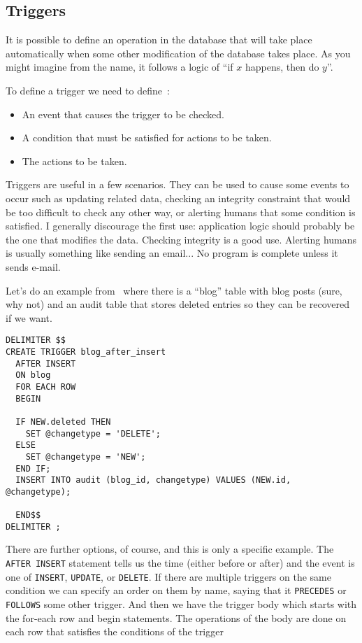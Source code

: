 \documentclass[a4paper]{report}
\begin{document}
\subsection*{Triggers}

It is possible to define an operation in the database that will take place automatically when some other modification of the database takes place. As you might imagine from the name, it follows a logic of ``if $x$ happens, then do $y$''. 

To define a trigger we need to define~\cite{dsc}:
\begin{itemize}
	\item An event that causes the trigger to be checked.
	\item A condition that must be satisfied for actions to be taken.
	\item The actions to be taken.
\end{itemize}

Triggers are useful in a few scenarios. They can be used to cause some events to occur such as updating related data, checking an integrity constraint that would be too difficult to check any other way, or alerting humans that some condition is satisfied. I generally discourage the first use: application logic should probably be the one that modifies the data. Checking integrity is a good use. Alerting humans is usually something like sending an email... No program is complete unless it sends e-mail.

Let's do an example from~\cite{trigger} where there is a ``blog'' table with blog posts (sure, why not) and an audit table that stores deleted entries so they can be recovered if we want.

{\small
\begin{verbatim}
DELIMITER $$
CREATE TRIGGER blog_after_insert 
  AFTER INSERT 
  ON blog
  FOR EACH ROW 
  BEGIN
  
  IF NEW.deleted THEN
    SET @changetype = 'DELETE';
  ELSE
    SET @changetype = 'NEW';
  END IF;  
  INSERT INTO audit (blog_id, changetype) VALUES (NEW.id, @changetype);
		
  END$$
DELIMITER ;
\end{verbatim}
}

There are further options, of course, and this is only a specific example. The \texttt{AFTER INSERT} statement tells us the time (either before or after) and the event is one of \texttt{INSERT}, \texttt{UPDATE}, or \texttt{DELETE}. If there are multiple triggers on the same condition we can specify an order on them by name, saying that it \texttt{PRECEDES} or \texttt{FOLLOWS} some other trigger. And then we have the trigger body which starts with the for-each row and begin statements. The operations of the body are done on each row that satisfies the conditions of the trigger
\end{document}
